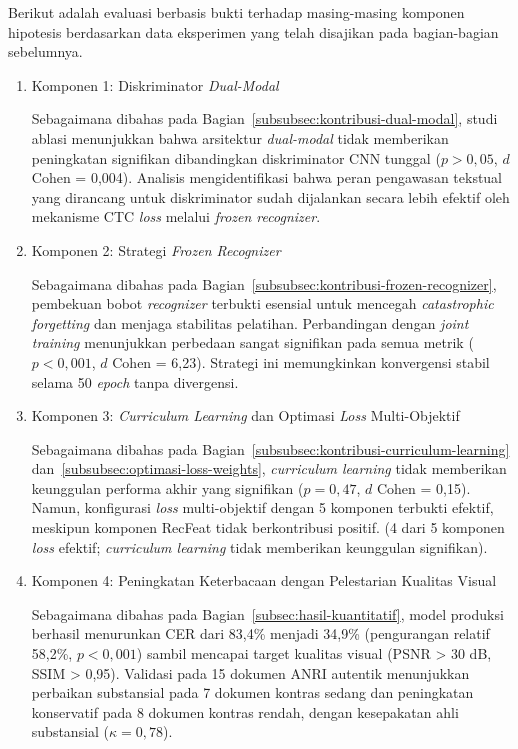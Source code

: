 Berikut adalah evaluasi berbasis bukti terhadap masing-masing komponen hipotesis berdasarkan data eksperimen yang telah disajikan pada bagian-bagian sebelumnya.

\begin{enumerate}[leftmargin=1.5em, labelsep=0.5em, itemindent=0pt, label=\arabic*., topsep=0pt, partopsep=0pt]
    \item Komponen 1: Diskriminator \textit{Dual-Modal}
    
    Sebagaimana dibahas pada Bagian~\ref{subsubsec:kontribusi-dual-modal}, studi ablasi menunjukkan bahwa arsitektur \textit{dual-modal} tidak memberikan peningkatan signifikan dibandingkan diskriminator CNN tunggal ($p > 0,05$, $d$ Cohen = 0,004). Analisis mengidentifikasi bahwa peran pengawasan tekstual yang dirancang untuk diskriminator sudah dijalankan secara lebih efektif oleh mekanisme CTC \textit{loss} melalui \textit{frozen recognizer}.

    \item Komponen 2: Strategi \textit{Frozen Recognizer}
    
    Sebagaimana dibahas pada Bagian~\ref{subsubsec:kontribusi-frozen-recognizer}, pembekuan bobot \textit{recognizer} terbukti esensial untuk mencegah \textit{catastrophic forgetting} dan menjaga stabilitas pelatihan. Perbandingan dengan \textit{joint training} menunjukkan perbedaan sangat signifikan pada semua metrik ($p < 0,001$, $d$ Cohen = 6,23). Strategi ini memungkinkan konvergensi stabil selama 50 \textit{epoch} tanpa divergensi.

    \item Komponen 3: \textit{Curriculum Learning} dan Optimasi \textit{Loss} Multi-Objektif
    
    Sebagaimana dibahas pada Bagian~\ref{subsubsec:kontribusi-curriculum-learning} dan~\ref{subsubsec:optimasi-loss-weights}, \textit{curriculum learning} tidak memberikan keunggulan performa akhir yang signifikan ($p = 0,47$, $d$ Cohen = 0,15). Namun, konfigurasi \textit{loss} multi-objektif dengan 5 komponen terbukti efektif, meskipun komponen RecFeat tidak berkontribusi positif. (4 dari 5 komponen \textit{loss} efektif; \textit{curriculum learning} tidak memberikan keunggulan signifikan).

    \item Komponen 4: Peningkatan Keterbacaan dengan Pelestarian Kualitas Visual
    
    Sebagaimana dibahas pada Bagian~\ref{subsec:hasil-kuantitatif}, model produksi berhasil menurunkan CER dari 83,4\% menjadi 34,9\% (pengurangan relatif 58,2\%, $p < 0,001$) sambil mencapai target kualitas visual (PSNR > 30 dB, SSIM > 0,95). Validasi pada 15 dokumen ANRI autentik menunjukkan perbaikan substansial pada 7 dokumen kontras sedang dan peningkatan konservatif pada 8 dokumen kontras rendah, dengan kesepakatan ahli substansial ($\kappa = 0,78$).
\end{enumerate}



